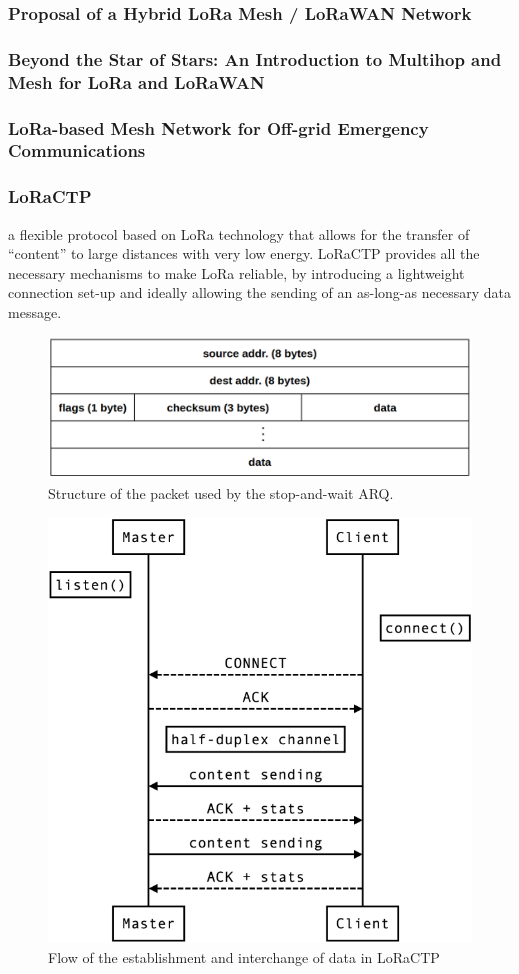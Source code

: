 			\subsubsection{Proposal of a Hybrid LoRa Mesh / LoRaWAN Network}
			
			\subsubsection{Beyond the Star of Stars: An Introduction to Multihop and Mesh for LoRa and LoRaWAN}
			
			\subsubsection{LoRa-based Mesh Network for Off-grid Emergency Communications}
			
			\subsubsection{LoRaCTP}
			
				a ﬂexible protocol based
				on LoRa technology that allows for the transfer of “content” to
				large distances with very low energy. LoRaCTP provides all the
				necessary mechanisms to make LoRa reliable, by introducing a
				lightweight connection set-up and ideally allowing the sending
				of an as-long-as necessary data message.
			
				\begin{figure}[H]
					\centering
					\includegraphics[width=.75\textwidth]{resources/img/chap4/loractp_packet}
					\caption[Flow of the establishment and interchange of data in LoRaCTP]{Structure of the packet used by the stop-and-wait ARQ. \cite{loractp}}
				\end{figure}
			
				\begin{figure}[H]
					\centering
					\includegraphics[width=.5\textwidth]{resources/img/loractp_flow}
					\caption[Flow of the establishment and interchange of data in LoRaCTP]{Flow of the establishment and interchange of data in LoRaCTP \cite{loractp}}
				\end{figure}
		
